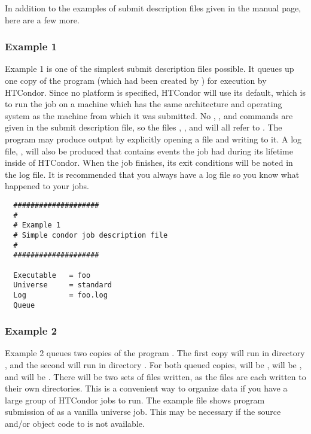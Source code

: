 In addition to the examples of submit description files given
in the 
 manual page, here are a few more.

\subsubsection{Example 1} 

Example 1 is one of the simplest submit description
files possible. It queues up one copy of the program 
(which had been created by )
for execution by HTCondor.
Since no platform is specified, HTCondor will use its default,
which is to run the job on a machine which has the
same architecture and operating system as the machine from which it was
submitted. 
No 
,
, and
commands are given in the submit
description file, so the
files , , and  will all refer to 
.
The program may produce output by explicitly opening a file and writing to
it.
A log file, , will also be produced that contains events
the job had during its lifetime inside of HTCondor.
When the job finishes, its exit conditions will be noted in the log file.
It is recommended that you always have a log file so you know what
happened to your jobs.
\begin{verbatim}
  ####################                                                    
  # 
  # Example 1                                                            
  # Simple condor job description file                                    
  #                                                                       
  ####################                                                    
                                                                          
  Executable   = foo                                                    
  Universe     = standard                                                    
  Log          = foo.log                                                    
  Queue    
\end{verbatim}

\subsubsection{Example 2}

Example 2 queues two copies of the program . The
first copy will run in directory , and the second will run in
directory . For both queued copies, 
 will be ,
 will be , and
 will be .
There will be two sets of files written,
as the files are each written to their own directories.
This is a convenient way to organize data if you
have a large group of HTCondor jobs to run. The example file 
shows program submission of
 as a vanilla universe job.
This may be necessary if the source
and/or object code to  is not available.

